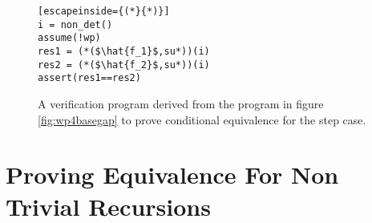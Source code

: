 \begin{figure} [h]
\begin{center}
\begin{minipage}{7 cm}
\begin{lstlisting}[escapeinside={(*}{*)}]
i = non_det()
assume(!wp)
res1 = (*($\hat{f_1}$,su*))(i)
res2 = (*($\hat{f_2}$,su*))(i)
assert(res1==res2)
\end{lstlisting}
\end{minipage}
\caption{A verification program derived from the program in figure \ref{fig:wp4basegap} to prove conditional equivalence for the step case.}
\label{fig:stepvefprogram}
\end{center}
\end{figure}

\section{Proving Equivalence For Non Trivial Recursions}
\label{sec:multistep}
